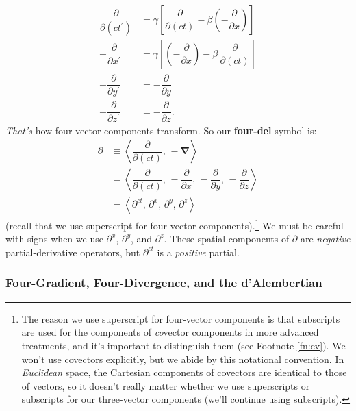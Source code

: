 \documentclass[12pt]{article}
\newcommand{\del}{\boldsymbol{\nabla}}
\begin{document}
\begin{equation*}
\begin{split}
\dfrac{\partial}{\partial (ct^\prime)} &= \gamma \left[ \dfrac{\partial}{\partial (ct)} - \beta \left(- \dfrac{\partial}{\partial x} \right) \right] \\[3pt]
- \dfrac{\partial}{\partial x^\prime} &= \gamma \left[ \left( - \dfrac{\partial}{\partial x} \right) - \beta \, \dfrac{\partial}{\partial (ct)}  \right] \\[3pt]
- \dfrac{\partial}{\partial y^\prime} &= - \dfrac{\partial}{\partial y} \\[3pt]
- \dfrac{\partial}{\partial z^\prime} &= - \dfrac{\partial}{\partial z} .
\end{split}
\end{equation*}
\emph{That's} how four-vector components transform. So our \textbf{four-del} symbol is:
\begin{equation}\label{eq:fn}
\boxed{
\begin{aligned}
\partialup &\equiv \left \langle \dfrac{\partial}{\partial (ct)} , \, - \del \right \rangle \\[3pt]
&= \left \langle \dfrac{\partial}{\partial (ct)} , \, - \dfrac{\partial}{\partial x}, \, - \dfrac{\partial}{\partial y}, \, - \dfrac{\partial}{\partial z} \right \rangle \\[3pt]
&=  \left \langle \partial^{ct}, \, \partial^x , \, \partial^y , \, \partial^z \right \rangle
\end{aligned}
}
\end{equation}
(recall that we use superscript for four-vector components).\footnote{The reason we use superscript for four-vector components is that subscripts are used for the components of \emph{co}vector components in more advanced treatments, and it's important to distinguish them (see Footnote \ref{fn:cv}). We won't use covectors explicitly, but we abide by this notational convention. In \emph{Euclidean} space, the Cartesian components of covectors are identical to those of vectors, so it doesn't really matter whether we use superscripts or subscripts for our three-vector components (we'll continue using subscripts).} We must be careful with signs when we use $\partial^x$, $\partial^y$, and $\partial^z$. These spatial components of $\partialup$ are \emph{negative} partial-derivative operators, but $\partial^{ct}$ is a \emph{positive} partial.


\subsubsection[Four-Gradient, Four-Divergence, and the d’Alembertian]{Four-Gradient, Four-Divergence, and the d'Alembertian}
\end{document}
